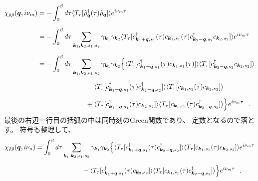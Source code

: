 \documentclass[a4j]{jsarticle}
\begin{document}
\begin{align}
	\chi_{\tilde{\rho} \tilde{\rho}}(\bm{q},i \nu_{m})
	 & =
	-
	\int^{\beta}_{0} d \tau
	\langle T_{\tau}[ \tilde{\rho}_{\bm{q}}^{\dagger} (\tau) \tilde{\rho}_{\bm{q}} ] \rangle
	e^{i \nu_{m} \tau}
	\nonumber \\[2mm]
	 & =
	-
	\int^{\beta}_{0} d \tau
	\sum_{\bm{k}_{1} , \bm{k}_{2} , s_{1} ,s_{2} }
	\gamma_{\bm{k}_{1}}
	\gamma_{\bm{k}_{2}}
	\langle T_{\tau} [
			c_{ \bm{k}_{1}+\bm{q} , s_{1} }^{\dagger} (\tau)
			c_{ \bm{k}_{1} , s_{1} } (\tau)
			c_{ \bm{k}_{2}-\bm{q} , s_{2} }^{\dagger}
			c_{ \bm{k}_{2} , s_{2} }
		] \rangle
	e^{i \nu_{m} \tau}
	\nonumber \\[2mm]
	 & =
	-
	\int^{\beta}_{0} d \tau
	\sum_{\bm{k}_{1} , \bm{k}_{2} , s_{1} ,s_{2} }
	\gamma_{\bm{k}_{1}}
	\gamma_{\bm{k}_{2}}
	\Big\{
	\langle T_{\tau} [
			c_{ \bm{k}_{1}+\bm{q} , s_{1} }^{\dagger} (\tau)
			c_{ \bm{k}_{1} , s_{1} } (\tau)
		] \rangle
	\langle T_{\tau} [
			c_{ \bm{k}_{2}-\bm{q} , s_{2} }^{\dagger}
			c_{ \bm{k}_{2} , s_{2} }
		] \rangle
	\nonumber \\[2mm] &
	\hspace{25mm} -
	\langle T_{\tau} [
			c_{ \bm{k}_{1}+\bm{q} , s_{1} }^{\dagger} (\tau)
			c_{ \bm{k}_{2}-\bm{q} , s_{2} }^{\dagger}
		] \rangle
	\langle T_{\tau} [
			c_{ \bm{k}_{1} , s_{1} } (\tau)
			c_{ \bm{k}_{2} , s_{2} }
		] \rangle
	\nonumber \\[2mm] &
	\hspace{25mm} +
	\langle T_{\tau} [
			c_{ \bm{k}_{1}+\bm{q} , s_{1} }^{\dagger} (\tau)
			c_{ \bm{k}_{2} , s_{2} }
		] \rangle
	\langle T_{\tau} [
			c_{ \bm{k}_{1} , s_{1} } (\tau)
			c_{ \bm{k}_{2}-\bm{q} , s_{2} }^{\dagger}
		] \rangle
	\Big\}
	e^{i \nu_{m} \tau}
	\ \ .
\end{align}
最後の右辺一行目の括弧の中は同時刻のGreen関数であり、
定数となるので落とす。
符号も整理して、
\begin{align}
	\chi_{\tilde{\rho} \tilde{\rho}}(\bm{q},i \nu_{n})
	 & =
	\int^{\beta}_{0} d \tau
	\sum_{\bm{k}_{1} , \bm{k}_{2} , s_{1} ,s_{2} }
	\gamma_{\bm{k}_{1}}
	\gamma_{\bm{k}_{2}}
	\Big\{
	\langle T_{\tau} [
			c_{ \bm{k}_{1}+\bm{q} , s_{1} }^{\dagger} (\tau)
			c_{ \bm{k}_{2}-\bm{q} , s_{2} }^{\dagger}
		] \rangle
	\langle T_{\tau} [
			c_{ \bm{k}_{1} , s_{1} } (\tau)
			c_{ \bm{k}_{2} , s_{2} }
		] \rangle
	e^{i \nu_{m} \tau}
	\nonumber \\[2mm] &
	\hspace{25mm} -
	\langle T_{\tau} [
			c_{ \bm{k}_{1}+\bm{q} , s_{1} }^{\dagger} (\tau)
			c_{ \bm{k}_{2} , s_{2} }
		] \rangle
	\langle T_{\tau} [
			c_{ \bm{k}_{1} , s_{1} } (\tau)
			c_{ \bm{k}_{2}-\bm{q} , s_{2} }^{\dagger}
		] \rangle
	\Big\}
	e^{i \nu_{m} \tau}
	\ \ .
	\label{eqn:timeintegralbefore141125}
\end{align}
\end{document}
